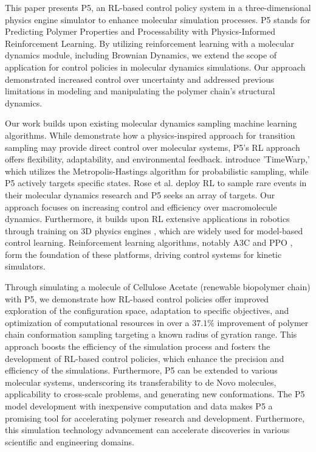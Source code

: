 \documentclass{article}
\theoremstyle{plain}
\theoremstyle{definition}
\theoremstyle{remark}
\begin{document}
This paper presents P5, an RL-based control policy system in a three-dimensional physics engine simulator to enhance molecular simulation processes. P5 stands for Predicting Polymer Properties and Processability with Physics-Informed Reinforcement Learning. By utilizing reinforcement learning with a molecular dynamics module, including Brownian Dynamics, we extend the scope of application for control policies in molecular dynamics simulations. Our approach demonstrated increased control over uncertainty and addressed previous limitations in modeling and manipulating the polymer chain's structural dynamics. 

Our work builds upon existing molecular dynamics sampling machine learning algorithms. While \citet{holdijk_path_2022} demonstrate how a physics-inspired approach for transition sampling may provide direct control over molecular systems, P5's RL approach offers flexibility, adaptability, and environmental feedback. \citet{klein_timewarp_2023} introduce 'TimeWarp,' which utilizes the Metropolis-Hastings algorithm for probabilistic sampling, while P5 actively targets specific states. Rose et al. \cite{rose_reinforcement_2021} deploy RL to sample rare events in their molecular dynamics research and P5 seeks an array of targets. Our approach focuses on increasing control and efficiency over macromolecule dynamics. Furthermore, it builds upon RL extensive applications in robotics through training on 3D physics engines \cite{muratore_robot_2022, brockman_openai_2016, todorov_mujoco_2012, juliani_unity_2020}, which are widely used for model-based control learning. Reinforcement learning algorithms, notably A3C \cite{mnih_asynchronous_2016} and PPO \cite{schulman_proximal_2017}, form the foundation of these platforms, driving control systems for kinetic simulators.

Through simulating a molecule of Cellulose Acetate (renewable biopolymer chain) with P5, we demonstrate how RL-based control policies offer improved exploration of the configuration space, adaptation to specific objectives, and optimization of computational resources in over a $37.1\%$  improvement of polymer chain conformation sampling targeting a known radius of gyration range. This approach boosts the efficiency of the simulation process and fosters the development of RL-based control policies, which enhance the precision and efficiency of the simulations. Furthermore, P5 can be extended to various molecular systems, underscoring its transferability to de Novo molecules, applicability to cross-scale problems, and generating new conformations. The P5 model development with inexpensive computation and data makes P5 a promising tool for accelerating polymer research and development. Furthermore, this simulation technology advancement can accelerate discoveries in various scientific and engineering domains. 
\end{document}

